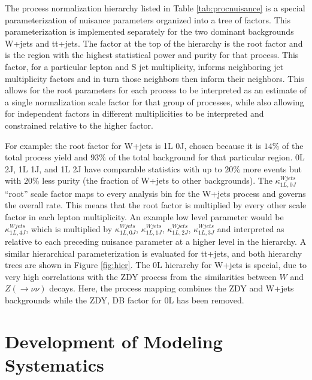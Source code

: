 The process normalization hierarchy listed in Table \ref{tab:procnuisance} is a special parameterization of nuisance parameters organized into a tree of factors. This parameterization is implemented separately for the two dominant backgrounds W+jets and tt+jets. The factor at the top of the hierarchy is the root factor and is the region with the highest statistical power and purity for that process. This factor, for a particular lepton and S jet multiplicity, informs neighboring jet multiplicity factors and in turn those neighbors then inform their neighbors. This allows for the root parameters for each process to be interpreted as an estimate of a single normalization scale factor for that group of processes, while also allowing for independent factors in different multiplicities to be interpreted and constrained relative to the higher factor. 

For example: the root factor for W+jets is 1L 0J, chosen because it is $14\%$ of the total process yield and $93\%$ of the total background for that particular region. 0L 2J, 1L 1J, and 1L 2J have comparable statistics with up to $20\%$ more events but with $20\%$ less purity (the fraction of W+jets to other backgrounds). The $\kappa^{Wjets}_{1L, 0J}$ ``root'' scale factor maps to every analysis bin for the W+jets process and governs the overall rate. This means that the root factor is multiplied by every other scale factor in each lepton multiplicity. An example low level parameter would be $\kappa^{Wjets}_{1L, 4J}$, which is multiplied by $\kappa^{Wjets}_{1L, 0J}$, $\kappa^{Wjets}_{1L, 1J}$, $\kappa^{Wjets}_{1L ,2J}$, $\kappa^{Wjets}_{1L, 3J}$ and interpreted as relative to each preceding nuisance parameter at a higher level in the hierarchy.  A similar hierarchical parameterization is evaluated for tt+jets, and both hierarchy trees are shown in Figure \ref{fig:hier}. The 0L hierarchy for W+jets is special, due to very high correlations with the ZDY process from the similarities between $W$ and $Z(\rightarrow\nu\nu)$ decays. Here, the process mapping combines the  ZDY and W+jets backgrounds while the ZDY, DB factor for 0L has been removed. 

\section{Development of Modeling Systematics}


